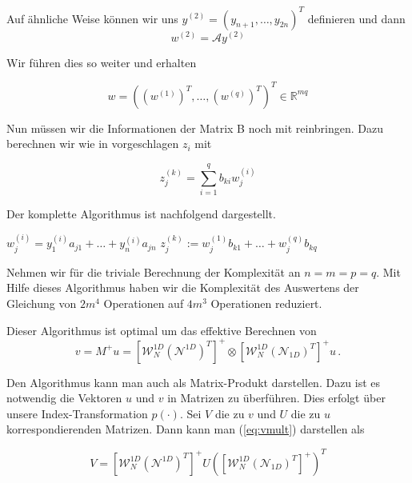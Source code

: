 Auf ähnliche Weise können wir uns $y^{(2)}=(y_{n+1},\dots,y_{2n})^{T}$ definieren und dann
\begin{equation*}
w^{(2)} = \mathcal{A}y^{(2)}
\end{equation*}

Wir führen dies so weiter und erhalten

\begin{equation*}
w=( (w^{(1)})^T , \dots, (w^{(q)})^T)^T \in \mathbb{R}^{mq}
\end{equation*}

Nun müssen wir die Informationen der Matrix B noch mit reinbringen. Dazu berechnen wir wie in \cite{Teachlet} vorgeschlagen $z_i$ mit

\begin{equation*}
z^{(k)}_j = \sum_{i=1}^{q} b_{ki} w_j^{(i)}
\end{equation*}

Der komplette Algorithmus ist nachfolgend dargestellt.
\begin{mdframed}[backgroundcolor=blue!3] 
\begin{algorithmic}
			\State $w^{(i)}_{j} = y^{(i)}_1 a_{j1} + \dots + y^{(i)}_n a_{jn}$
	\EndFor
\EndFor
{}
			\State $z^{(k)}_j := w^{(1)}_j b_{k1} + \dots + w^{(q)}_j b_{kq}$
	\EndFor
\EndFor

\end{algorithmic}
\end{mdframed}


Nehmen wir für die triviale Berechnung der Komplexität an $n=m=p=q$.
Mit Hilfe dieses Algorithmus haben wir die Komplexität des Auswertens der Gleichung von $2m^4$ Operationen auf $4m^3$ Operationen reduziert.

Dieser Algorithmus ist optimal um das effektive Berechnen von
\begin{equation} \label{eq:vmult}
v=M^+u=[\mathcal{W}_N^{1D} (\mathcal{N}^{1D})^T]^+ \otimes [\mathcal{W}_N^{1D} (\mathcal{N}_{1D})^T]^+ u \,.
\end{equation}

Den Algorithmus kann man auch als Matrix-Produkt darstellen. Dazu ist es notwendig die Vektoren $u$ und $v$ in Matrizen zu überführen. Dies erfolgt über unsere Index-Transformation $p(\cdot)$. Sei $V$ die zu $v$ und $U$ die zu $u$ korrespondierenden Matrizen. Dann kann man (\ref{eq:vmult}) darstellen als

\begin{equation}
V= [\mathcal{W}_N^{1D} (\mathcal{N}^{1D})^T]^+ U ([\mathcal{W}_N^{1D} (\mathcal{N}_{1D})^T]^+)^T
\end{equation}

